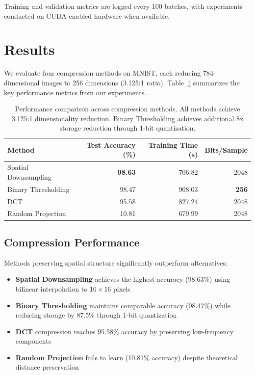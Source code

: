 \documentclass{article} %
\begin{document}
Training and validation metrics are logged every 100 batches, with experiments conducted on CUDA-enabled hardware when available.

\section{Results}
\label{sec:results}

We evaluate four compression methods on MNIST, each reducing 784-dimensional images to 256 dimensions (3.125:1 ratio). Table~\ref{tab:results} summarizes the key performance metrics from our experiments.

\begin{table}[h]
\centering
\begin{tabular}{lrrr}
\toprule
Method & Test Accuracy (\%) & Training Time (s) & Bits/Sample \\
\midrule
Spatial Downsampling & \textbf{98.63} & 706.82 & 2048 \\
Binary Thresholding & 98.47 & 908.03 & \textbf{256} \\
DCT & 95.58 & 827.24 & 2048 \\
Random Projection & 10.81 & 679.99 & 2048 \\
\bottomrule
\end{tabular}
\caption{Performance comparison across compression methods. All methods achieve 3.125:1 dimensionality reduction. Binary Thresholding achieves additional 8x storage reduction through 1-bit quantization.}
\label{tab:results}
\end{table}

\subsection{Compression Performance}
Methods preserving spatial structure significantly outperform alternatives:

\begin{itemize}
    \item \textbf{Spatial Downsampling} achieves the highest accuracy (98.63\%) using bilinear interpolation to $16 \times 16$ pixels
    \item \textbf{Binary Thresholding} maintains comparable accuracy (98.47\%) while reducing storage by 87.5\% through 1-bit quantization
    \item \textbf{DCT} compression reaches 95.58\% accuracy by preserving low-frequency components
    \item \textbf{Random Projection} fails to learn (10.81\% accuracy) despite theoretical distance preservation
\end{itemize}
\end{document}

